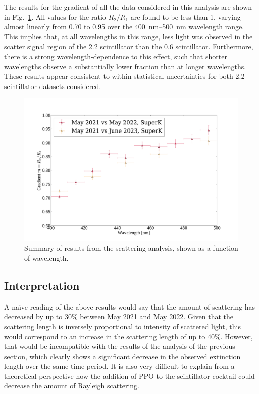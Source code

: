 The results for the gradient of all the data considered in this analysis are shown in Fig.~\ref{fig:smellie_scat_results_vs_wavelength}. All values for the ratio $R_{2}/R_{1}$ are found to be less than 1, varying almost linearly from 0.70 to 0.95 over the \SIrange{400}{500}{\nm} wavelength range. This implies that, at all wavelengths in this range, less light was observed in the scatter signal region of the \SI{2.2}{\gpl} scintillator than the \SI{0.6}{\gpl} scintillator. Furthermore, there is a strong wavelength-dependence to this effect, such that shorter wavelengths observe a substantially lower fraction than at longer wavelengths. These results appear consistent to within statistical uncertainties for both \SI{2.2}{\gpl} scintillator datasets considered.

\begin{figure}
    \centering
    \includegraphics[width=\textwidth]{5_SMELLIEAnalysis/images/scattering_results_summary.pdf}
    \caption[Summary of results from the scattering analysis]
    {Summary of results from the scattering analysis, shown as a function of wavelength.}
    \label{fig:smellie_scat_results_vs_wavelength}
\end{figure}

\subsection{Interpretation}\label{sec:smellie_scat_discussion}
A na\"{i}ve reading of the above results would say that the amount of scattering has decreased by up to 30\% between May 2021 and May 2022. Given that the scattering length is inversely proportional to intensity of scattered light, this would correspond to an increase in the scattering length of up to 40\%. However, that would be incompatible with the results of the analysis of the previous section, which clearly shows a significant decrease in the observed extinction length over the same time period. It is also very difficult to explain from a theoretical perspective how the addition of PPO to the scintillator cocktail could decrease the amount of Rayleigh scattering.

